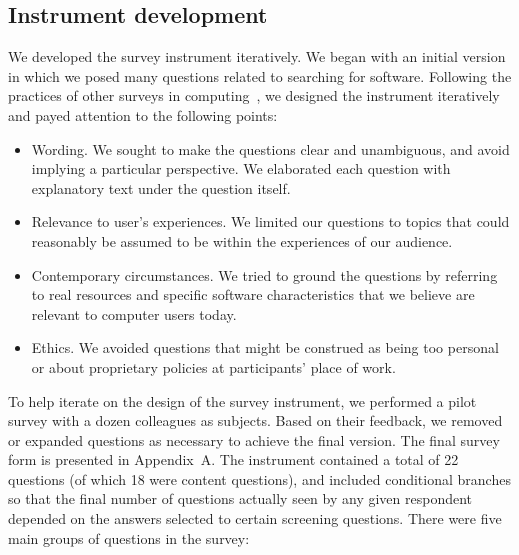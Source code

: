\documentclass{casicswhitepaper}
\begin{document}
\subsection{Instrument development}

We developed the survey instrument iteratively.  We began with an initial version in which we posed many questions related to searching for software.  Following the practices of other surveys in computing~\cite[e.g.,][]{varnellsarjeant2015comparing, kitchenham_2008}, we designed the instrument iteratively and payed attention to the following points:

\begin{itemize}

\item Wording.  We sought to make the questions clear and unambiguous, and avoid implying a particular perspective.  We elaborated each question with explanatory text under the question itself.

\item Relevance to user's experiences.  We limited our questions to topics that could reasonably be assumed to be within the experiences of our audience.

\item Contemporary circumstances.  We tried to ground the questions by referring to real resources and specific software characteristics that we believe are relevant to computer users today.

\item Ethics.  We avoided questions that might be construed as being too personal or about proprietary policies at participants' place of work.

\end{itemize}

To help iterate on the design of the survey instrument, we performed a pilot survey with a dozen colleagues as subjects.  Based on their feedback, we removed or expanded questions as necessary to achieve the final version.  The final survey form is presented in Appendix~A.  The instrument contained a total of 22 questions (of which 18 were content questions), and included conditional branches so that the final number of questions actually seen by any given respondent depended on the answers selected to certain screening questions.  There were five main groups of questions in the survey:
\end{document}
